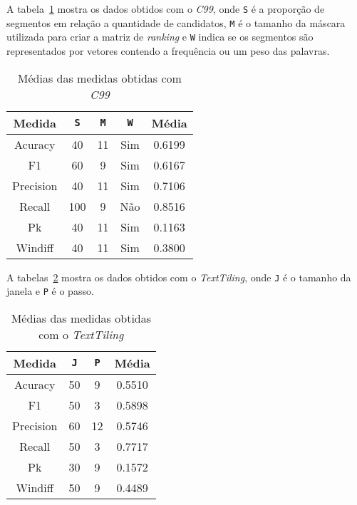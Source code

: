 A tabela~\ref{tab:mediasC99} mostra os dados obtidos com o \textit{C99}, onde \texttt{S} é a proporção de segmentos em relação a quantidade de candidatos, \texttt{M} é o tamanho da máscara utilizada para criar a matriz de \textit{ranking} e \texttt{W} indica se os segmentos são representados por vetores contendo a frequência ou um peso das palavras. 



\begin{table}[!h]
	\centering

	\begin{tabular}{|c|c|c|c|c|}
	
		\hline
		Medida & \texttt{S} & \texttt{M} & \texttt{W} & \textbf{Média}\\		
		\hline

		Acuracy		& 40	& 11 & Sim & 0.6199	\\ \hline	
		F1			& 60	& 9	 & Sim & 0.6167	\\ \hline	
		Precision	& 40	& 11 & Sim & 0.7106	\\ \hline			
		Recall		& 100	& 9	 & Não & 0.8516	\\ \hline		
		Pk			& 40	& 11 & Sim & 0.1163	\\ \hline	
		Windiff		& 40	& 11 & Sim & 0.3800	\\ \hline		

		
	\end{tabular}
	
	\caption{Médias das medidas obtidas com \textit{C99}}
	\label{tab:mediasC99}
\end{table}


A tabelas~\ref{tab:mediasTextTiling} mostra os dados obtidos com o \textit{TextTiling}, onde \texttt{J} é o tamanho da janela e \texttt{P} é o passo.

\begin{table}[!h]
	\centering

	\begin{tabular}{|c|c|c|c|}
	
		\hline
		Medida & \texttt{J} & \texttt{P} & \textbf{Média}\\		
		\hline

		Acuracy		& 50 & 9 	& 0.5510 \\ \hline	
		F1			& 50 & 3 	& 0.5898 \\ \hline	
		Precision	& 60 & 12 	& 0.5746 \\ \hline			
		Recall		& 50 & 3 	& 0.7717 \\ \hline		
		Pk			& 30 & 9 	& 0.1572 \\ \hline	
		Windiff		& 50 & 9 	& 0.4489 \\ \hline		

		
	\end{tabular}
	
	\caption{Médias das medidas obtidas com o \textit{TextTiling}}
	\label{tab:mediasTextTiling}
\end{table}


